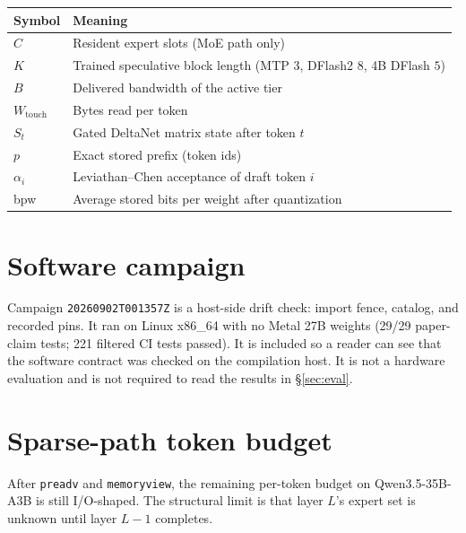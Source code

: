 \begin{center}
\small
\begin{tabular}{@{}ll@{}}
\toprule
Symbol & Meaning \\
\midrule
$C$ & Resident expert slots (MoE path only) \\
$K$ & Trained speculative block length (MTP $3$, DFlash2 $8$, 4B DFlash $5$) \\
$B$ & Delivered bandwidth of the active tier \\
$W_{\mathrm{touch}}$ & Bytes read per token \\
$S_t$ & Gated DeltaNet matrix state after token $t$ \\
$p$ & Exact stored prefix (token ids) \\
$\alpha_i$ & Leviathan--Chen acceptance of draft token $i$ \\
bpw & Average stored bits per weight after quantization \\
\bottomrule
\end{tabular}
\end{center}

\section{Software campaign}
\label{app:campaign}

Campaign \texttt{20260902T001357Z} is a host-side drift check: import fence, catalog, and recorded pins. It ran on Linux x86\_64 with no Metal 27B weights (29/29 paper-claim tests; 221 filtered CI tests passed). It is included so a reader can see that the software contract was checked on the compilation host. It is not a hardware evaluation and is not required to read the results in \S\ref{sec:eval}.

\section{Sparse-path token budget}
\label{app:budget}

After \texttt{preadv} and \texttt{memoryview}, the remaining per-token budget on Qwen3.5-35B-A3B is still I/O-shaped. The structural limit is that layer $L$'s expert set is unknown until layer $L{-}1$ completes.

